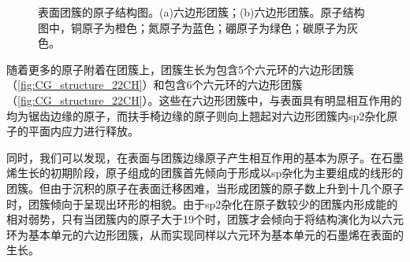     \begin{figure}[htb]
        \caption{表面团簇的原子结构图。(a)六边形团簇；(b)六边形团簇。原子结构图中，铜原子为橙色；氮原子为蓝色；硼原子为绿色；碳原子为灰色。}
        \label{fig:CG_CG_structure_22-24C}
    \end{figure}

    随着更多的原子附着在团簇上，团簇生长为包含5个六元环的六边形团簇（\ref{fig:CG_structure_22CH}）和包含6个六元环的六边形团簇（\ref{fig:CG_structure_22CH}）。这些在六边形团簇中，与表面具有明显相互作用的均为锯齿边缘的原子，而扶手椅边缘的原子则向上翘起对六边形团簇内sp2杂化原子的平面内应力进行释放。
    
    同时，我们可以发现，在表面与团簇边缘原子产生相互作用的基本为原子。在石墨烯生长的初期阶段，原子组成的团簇首先倾向于形成以sp杂化为主要组成的线形的团簇。但由于沉积的原子在表面迁移困难，当形成团簇的原子数上升到十几个原子时，团簇倾向于呈现出环形的相貌。由于sp2杂化在原子数较少的团簇内形成能的相对弱势，只有当团簇内的原子大于19个时，团簇才会倾向于将结构演化为以六元环为基本单元的六边形团簇，从而实现同样以六元环为基本单元的石墨烯在表面的生长。

